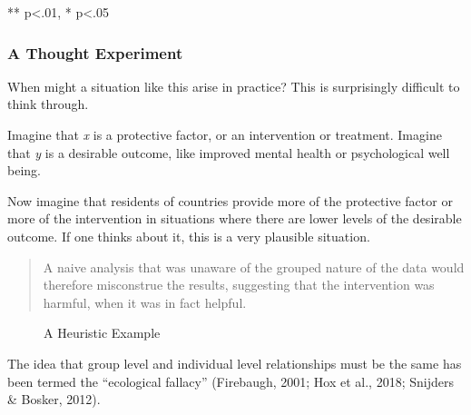 \documentclass[
  letterpaper,
  DIV=11,
  numbers=noendperiod]{scrreprt}
\begin{document}
** p\textless.01, * p\textless.05

\subsubsection{A Thought Experiment}\label{a-thought-experiment}

When might a situation like this arise in practice? This is surprisingly
difficult to think through.

Imagine that \emph{x} is a protective factor, or an intervention or
treatment. Imagine that \emph{y} is a desirable outcome, like improved
mental health or psychological well being.

Now imagine that residents of countries provide more of the protective
factor or more of the intervention in situations where there are lower
levels of the desirable outcome. If one thinks about it, this is a very
plausible situation.

\begin{quote}
A naive analysis that was unaware of the grouped nature of the data
would therefore misconstrue the results, suggesting that the
intervention was harmful, when it was in fact helpful.
\end{quote}

\begin{figure}


\caption{\label{fig-heuristic-example}A Heuristic Example}

\end{figure}%

The idea that group level and individual level relationships must be the
same has been termed the ``ecological fallacy'' (Firebaugh, 2001; Hox et
al., 2018; Snijders \& Bosker, 2012). 
\end{document}
